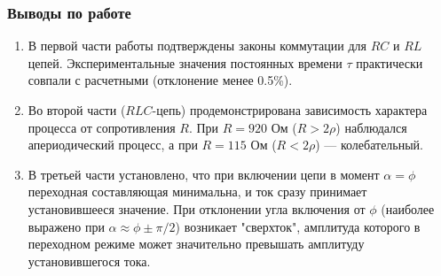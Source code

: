 \documentclass[a4paper,12pt]{article}
\begin{document}
\subsubsection*{Выводы по работе}
\begin{enumerate}
    \item В первой части работы подтверждены законы коммутации для $RC$ и $RL$ цепей. Экспериментальные значения постоянных времени $\tau$ практически совпали с расчетными (отклонение менее 0.5\%).
    \item Во второй части ($RLC$-цепь) продемонстрирована зависимость характера процесса от сопротивления $R$. При $R=920$ Ом ($R > 2\rho$) наблюдался апериодический процесс, а при $R=115$ Ом ($R < 2\rho$) — колебательный. 
    \item В третьей части установлено, что при включении цепи в момент $\alpha = \phi$ переходная составляющая минимальна, и ток сразу принимает установившееся значение. При отклонении угла включения от $\phi$ (наиболее выражено при $\alpha \approx \phi \pm \pi/2$) возникает "сверхток", амплитуда которого в переходном режиме может значительно превышать амплитуду установившегося тока. 
\end{enumerate}
\end{document}
